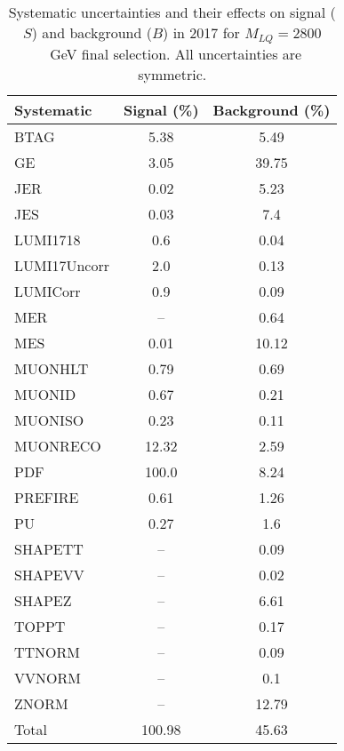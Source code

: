 \begin{table}[htbp]
\begin{center}
\caption{Systematic uncertainties and their effects on signal ($S$) and background ($B$) in 2017 for $M_{LQ}=2800$~GeV final selection. All uncertainties are symmetric.}
\begin{tabular}{lcc}
\hline\hline
Systematic & Signal (\%) & Background (\%) \\ \hline 
BTAG & 5.38 & 5.49\\ 
GE & 3.05 & 39.75\\ 
JER & 0.02 & 5.23\\ 
JES & 0.03 & 7.4\\ 
LUMI1718 & 0.6 & 0.04\\ 
LUMI17Uncorr & 2.0 & 0.13\\ 
LUMICorr & 0.9 & 0.09\\ 
MER & -- & 0.64\\ 
MES & 0.01 & 10.12\\ 
MUONHLT & 0.79 & 0.69\\ 
MUONID & 0.67 & 0.21\\ 
MUONISO & 0.23 & 0.11\\ 
MUONRECO & 12.32 & 2.59\\ 
PDF & 100.0 & 8.24\\ 
PREFIRE & 0.61 & 1.26\\ 
PU & 0.27 & 1.6\\ 
SHAPETT & -- & 0.09\\ 
SHAPEVV & -- & 0.02\\ 
SHAPEZ & -- & 6.61\\ 
TOPPT & -- & 0.17\\ 
TTNORM & -- & 0.09\\ 
VVNORM & -- & 0.1\\ 
ZNORM & -- & 12.79\\ 
Total & 100.98 & 45.63\\ \hline \hline
\end{tabular}
\label{tab:SysUncertainties_uujj_2800}
\end{center}
\end{table}

